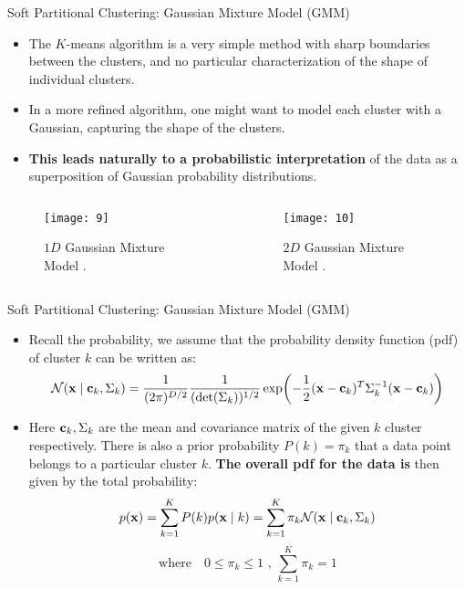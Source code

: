 \documentclass[compress,oilve]{beamer}
\begin{document}
\begin{frame}{Soft Partitional Clustering: Gaussian Mixture Model (GMM)}
\begin{itemize}
\item The $K$-means algorithm is a very simple method with sharp boundaries between the clusters, and no particular characterization of the shape of individual clusters.
\item In a more refined algorithm, one might want to model each cluster with a Gaussian, capturing the shape of the clusters.
\item \textbf{This leads naturally to a probabilistic interpretation} of the data as a superposition of Gaussian probability distributions.
\end{itemize}
\begin{columns}
	\begin{column}{0.5\textwidth}
		\begin{figure}
			 \centering
			 \texttt{[image: 9]} 
			 \caption{$1D$ Gaussian Mixture Model .}
		\end{figure}
	\end{column}
	\begin{column}{0.5\textwidth}
		\begin{figure}
			 \centering
			 \texttt{[image: 10]}  
			 \caption{$2D$ Gaussian Mixture Model .}
		\end{figure}
	\end{column}
\end{columns}
\end{frame}


\begin{frame}{Soft Partitional Clustering: Gaussian Mixture Model (GMM)}
\begin{itemize}
\item Recall the probability, we assume that  the probability density function (pdf) of cluster $k$ can be written as:
$$ \mathcal{N}(\mathbf{x} \mid \mathbf{c_{\mathnormal k}}, \Sigma_{k}) = \frac{1}{(2\pi)^{D/2}}\frac{1}{(\det(\Sigma_{k}))^{1/2}}\exp(-\frac{1}{2}(\mathbf{x} - \mathbf{c_{\mathnormal k}})^{T}\Sigma_{k}^{-1}(\mathbf{x} - \mathbf{c_{\mathnormal k}}))$$
\item Here $ \mathbf{c_{\mathnormal k}}, \Sigma_{k} $ are the mean and covariance matrix of the given $ k $ cluster respectively. There is also a prior probability $P(k) = \pi_{k} $ that a data point belongs to a particular cluster $k$. \textbf{The overall pdf for the data is} then given by the total probability:
$$ p(\mathbf{x}) = \displaystyle\sum_{k=1}^{K} P(k) p(\mathbf{x} \mid k) = \displaystyle\sum_{k=1}^{K} \pi_{k} \mathcal{N}(\mathbf{x} \mid \mathbf{c_{\mathnormal k}}, \Sigma_{k}) $$
$$ \text{where} \quad 0 \leq \pi_{k} \leq 1 \text{ , }\displaystyle\sum_{k=1}^{K} \pi_{k} = 1 $$
\end{itemize}
\end{frame}
\end{document}
